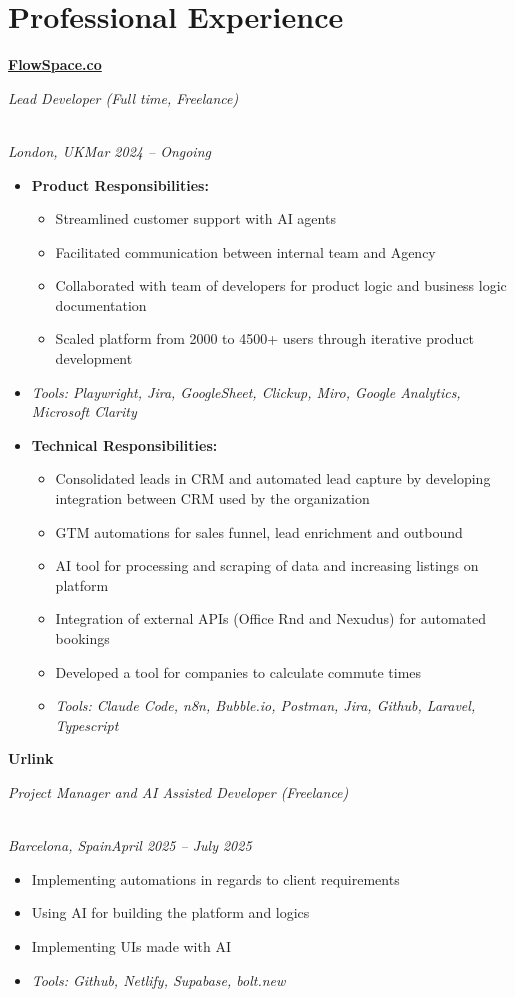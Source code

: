 \documentclass[a4paper,10pt]{article}
\newcommand{\role}[4]{\vspace{3pt}\noindent\hspace{0.6em}\parbox[t]{0.38\textwidth}{\raggedright\textbf{#1}}\hfill\parbox[t]{0.58\textwidth}{\raggedleft\textit{#2}}\\{\textit{#3}\hfill\textit{#4}}\vspace{1pt}}
\begin{document}
\section{Professional Experience}
\role{\href{https://flowspace.co}{FlowSpace.co}}{Lead Developer (Full time, Freelance)}{London, UK}{Mar 2024 -- Ongoing}
\begin{itemize}
\item \textbf{Product Responsibilities:}
\begin{itemize}[label=--]
\item Streamlined customer support with AI agents
\item Facilitated communication between internal team and Agency
\item Collaborated with team of developers for product logic and business logic documentation
\item Scaled platform from 2000 to 4500+ users through iterative product development
\end{itemize}
\item \textit{Tools: Playwright, Jira, GoogleSheet, Clickup, Miro, Google Analytics, Microsoft Clarity}
\item \textbf{Technical Responsibilities:}
\begin{itemize}[label=--]
\item Consolidated leads in CRM and automated lead capture by developing integration between CRM used by the organization
\item GTM automations for sales funnel, lead enrichment and outbound
\item AI tool for processing and scraping of data and increasing listings on platform
\item Integration of external APIs (Office Rnd and Nexudus) for automated bookings
\item Developed a tool for companies to calculate commute times
\item \textit{Tools: Claude Code, n8n, Bubble.io, Postman, Jira, Github, Laravel, Typescript}
\end{itemize}
\end{itemize}

\role{Urlink}{Project Manager and AI Assisted Developer (Freelance)}{Barcelona, Spain}{April 2025 -- July 2025}
\begin{itemize}
\item Implementing automations in regards to client requirements
\item Using AI for building the platform and logics
\item Implementing UIs made with AI
\item \textit{Tools: Github, Netlify, Supabase, bolt.new}
\end{itemize}
\end{document}
